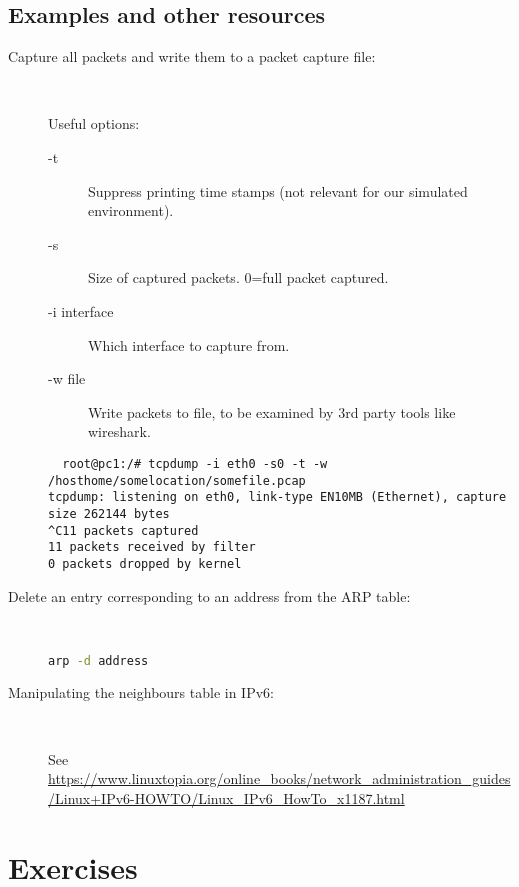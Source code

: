 \documentclass[12pt]{book}
\begin{document}
\subsection{Examples and other resources}\label{examples.lab1}

\begin{description}
\item[Capture all packets and write them to a packet capture file:] ~

  Useful options:
  \begin{description}
    \item [-t] Suppress printing time stamps (not relevant for our
      simulated environment).
    \item [-s] Size of captured packets. 0=full packet captured.
    \item [-i interface] Which interface to capture from.
    \item [-w file] Write packets to file, to be examined by 3rd party
      tools like wireshark.
  \end{description}
  
\begin{lstlisting}
  root@pc1:/# tcpdump -i eth0 -s0 -t -w /hosthome/somelocation/somefile.pcap
tcpdump: listening on eth0, link-type EN10MB (Ethernet), capture size 262144 bytes
^C11 packets captured
11 packets received by filter
0 packets dropped by kernel
\end{lstlisting}
  
\item[Delete an entry corresponding to an address from the ARP
  table:]~

\begin{lstlisting}[language=bash]
      arp -d address
\end{lstlisting}

\item[Manipulating the neighbours table in IPv6:]~

See \url{https://www.linuxtopia.org/online_books/network_administration_guides/Linux+IPv6-HOWTO/Linux_IPv6_HowTo_x1187.html}

\end{description}

\section{Exercises}
\end{document}
